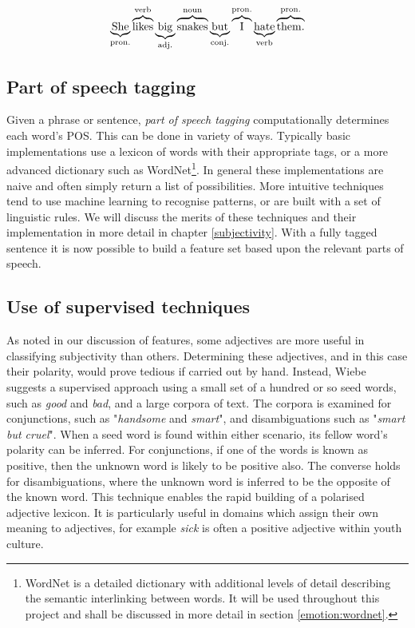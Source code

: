 \begin{equation}
	\underbrace{{\rm She}}_{\rm pron.} \overbrace{{\rm likes}}^{\rm verb} \underbrace{{\rm big}}_{\rm adj.} \overbrace{{\rm snakes}}^{\rm noun} \underbrace{{\rm but}}_{\rm conj.} \overbrace{{\rm I}}^{\rm pron.} \underbrace{{\rm hate}}_{\rm verb} \overbrace{{\rm them.}}^{\rm pron.}
\end{equation}

\subsection{Part of speech tagging}
\label{background:pos}

Given a phrase or sentence, \emph{part of speech tagging} computationally determines each word's POS. This can be done in variety of ways. Typically basic implementations use a lexicon of words with their appropriate tags, or a more advanced dictionary such as WordNet\footnote{WordNet is a detailed dictionary with additional levels of detail describing the semantic interlinking between words. It will be used throughout this project and shall be discussed in more detail in section \ref{emotion:wordnet}.}. In general these implementations are naive and often simply return a list of possibilities. More intuitive techniques tend to use machine learning to recognise patterns, or are built with a set of linguistic rules. We will discuss the merits of these techniques and their implementation in more detail in chapter \ref{subjectivity}. With a fully tagged sentence it is now possible to build a feature set based upon the relevant parts of speech.

\subsection{Use of supervised techniques}

As noted in our discussion of features, some adjectives are more useful in classifying subjectivity than others. Determining these adjectives, and in this case their polarity, would prove tedious if carried out by hand. Instead, Wiebe \cite{Wiebe:2000ub} suggests a supervised approach using a small set of a hundred or so seed words, such as \emph{good} and \emph{bad}, and a large corpora of text. The corpora is examined for conjunctions, such as "\emph{handsome} and \emph{smart}", and disambiguations such as "\emph{smart but cruel}". When a seed word is found within either scenario, its fellow word's polarity can be inferred. For conjunctions, if one of the words is known as positive, then the unknown word is likely to be positive also. The converse holds for disambiguations, where the unknown word is inferred to be the opposite of the known word. This technique enables the rapid building of a polarised adjective lexicon. It is particularly useful in domains which assign their own meaning to adjectives, for example \emph{sick} is often a positive adjective within youth culture.

